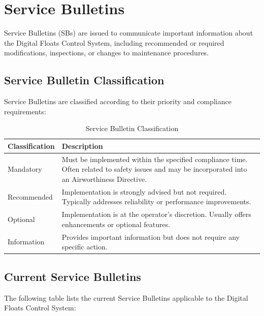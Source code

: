 \documentclass[12pt,a4paper,twoside,openright]{book}
\newcommand{\tabletextfont}{\normalfont\rmfamily}
\newcommand{\tableheadfont}{\normalfont\bfseries}
\begin{document}
\section{Service Bulletins}

Service Bulletins (SBs) are issued to communicate important information about the Digital Floats Control System, including recommended or required modifications, inspections, or changes to maintenance procedures.

\subsection{Service Bulletin Classification}

Service Bulletins are classified according to their priority and compliance requirements:

\begin{table}[h]
\centering
\setlength{\tabcolsep}{5pt} %
\begin{tabular}{|p{}|p{}|}
\hline
\tableheadfont\textbf{Classification} & \tableheadfont\textbf{Description} \\
\hline
\tabletextfont Mandatory & Must be implemented within the specified compliance time. Often related to safety issues and may be incorporated into an Airworthiness Directive. \\
\hline
\tabletextfont Recommended & Implementation is strongly advised but not required. Typically addresses reliability or performance improvements. \\
\hline
\tabletextfont Optional & Implementation is at the operator's discretion. Usually offers enhancements or optional features. \\
\hline
\tabletextfont Information & Provides important information but does not require any specific action. \\
\hline
\end{tabular}
\caption{Service Bulletin Classification}
\end{table}

\subsection{Current Service Bulletins}

The following table lists the current Service Bulletins applicable to the Digital Floats Control System:
\end{document}
